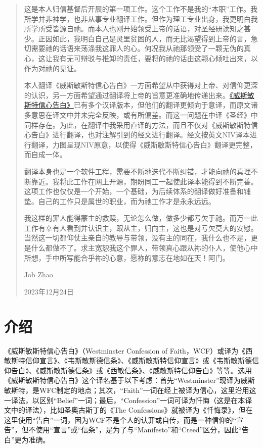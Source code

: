 \documentclass[12pt, a4paper, oneside]{ctexart}
\begin{document}
\begin{abstract}
	这是本人归信基督后开展的第一项工作。这个工作不是我的“本职”工作。我所学并非神学，也非从事专业翻译工作。但作为理工专业出身，我更明白我所学所受皆源自祂。而本人也刚开始领受上帝的话语，对圣经研读知之甚少。正因如此，我明白自己是灵里贫困的人，而无比渴望得到上帝的言，急切需要祂的话语来荡涤我这罪人的心。何况我从祂那领受了一颗无伪的真心，这让我有无可辩驳与推卸的责任，要将的祂的话由这颗心倾吐出来，以作为对祂的见证。

	本人翻译《威斯敏斯特信心告白》一方面希望从中获得对上帝、对信仰更深的认识，另一方面希望通过翻译将上帝的旨意更准确地传递出来。\href{https://www.bible.world/%E5%A8%81%E6%96%AF%E6%95%8F%E6%96%AF%E7%89%B9%E4%BF%A1%E6%9D%A1}{《威斯敏斯特信心告白》}已有多个汉译版本，但他们的翻译更倾向于意译，而原文诸多意思在译文中并未完全反映，或有所偏差。而这一问题在中译《圣经》中同样存在。为此，在翻译中我采用直译的方法，而且不仅对《威斯敏斯特信心告白》进行翻译，也对注解引到的经文进行翻译。经文按英文NIV译本进行翻译，力图呈现NIV原意，以使得《威斯敏斯特信心告白》翻译更完整，而自成一体。
	
	翻译本身也是一个软件工程，需要不断地迭代不断纠错，才能向祂的真理不断靠近。我将此工作在网上开源，期盼同工一起使此译本能得到不断完善。这项工作也仅仅是一个开始，一个基础，为后续体系的翻译做好准备和铺垫。自己的工作只是属世的职业，而为祂工作才是永永远远。
	
	我这样的罪人能得蒙主的救赎，无论怎么做，做多少都亏欠于祂。而万一此工作有幸有人看到并认识主，跟从主，归向主，这也是对亏欠莫大的安慰。当然这一切都仰仗主亲自的教导与带领，没有主的同在，我什么也不是，更是什么都做不了。求主宽恕我这个罪人，带领真心跟从祢的仆人，使他心中所想，手中所写能合乎祢的心意，愿祢的意志在地如在天！阿门。
	
	\hfill Job Zhao

	\hfill 2023年12月24日
    
\end{abstract}

\newpage
{}
\setcounter{page}{1}
\tableofcontents
\newpage
\setcounter{page}{1}

\section*{介绍}

《威斯敏斯特信心告白》（Westminster Confession of Faith，WCF）或译为《西敏斯特信仰宣言》、《韦斯敏斯德信条》、《威斯敏斯特信仰宣言》或《韦斯敏斯德信仰告白》、《威斯敏斯德信条》或《西敏信条》、《威敏斯特信仰告白》等等。选用《威斯敏斯特信心告白》这个译名基于以下考虑：首先“Westminster”现译为威斯敏斯特，是WFC制定的地点；其次，“Faith”一词在经上被译为信心，这里沿用这一译法，以区别“Belief”一词；最后，“Confession”一词可译为忏悔（这是在本译文中的译法），比如圣奥古斯丁的《The Confessions》就被译为《忏悔录》，但在这里使用“告白”一词，因为WCF不是个人的认罪或自传，而是一种信仰的“宣告”，但不使用“宣言”或“信条”，是为了与“Manifesto”和“Creed”区分，因此“告白”更为准确。
\end{document}
